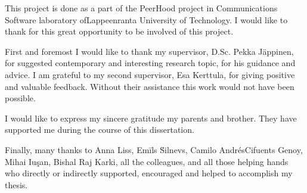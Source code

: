 %
%
This project is done as a part of the PeerHood project in Communications Software laboratory ofLappeenranta University of Technology.
%
I would like to thank for this great opportunity to be involved of this project.

%
First and foremost I would like to thank my supervisor, D.Sc. Pekka J\"appinen, for suggested contemporary and interesting research topic, for his guidance and advice. 
%
I am grateful to my second supervisor, Esa Kerttula, for giving positive and valuable feedback. 
%
Without their assistance this work would not have been possible.

%
I would like to express my sincere gratitude my parents and brother.
%
They have supported me during the course of this dissertation.

%
Finally, many thanks to Anna Liss, Em\={i}ls \u{S}i\cb l\cb nevs, Camilo Andr\'{e}sCifuents Genoy, Mihai Iu\c{s}an, Bishal Raj Karki, all the colleagues, and all those helping hands who directly or indirectly supported, encouraged and helped to accomplish my thesis.